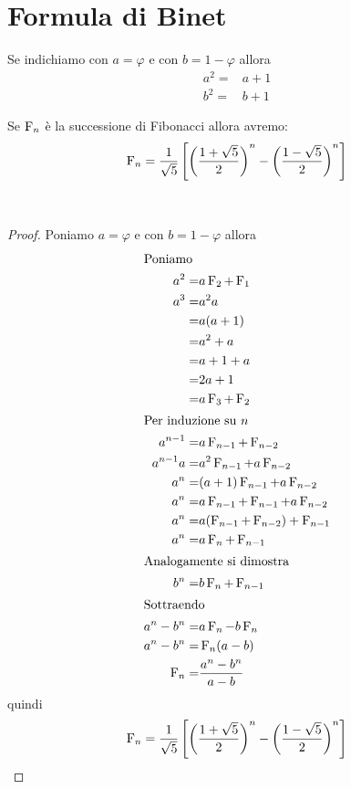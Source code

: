 \section{Formula di Binet}
\begin{lem}\label{lem:SezioneAurea}
	Se indichiamo con $a=\varphi$ e con $b=1-\varphi$
	allora
	\begin{align*}
		a^2=&a+1\\
		b^2=&b+1
	\end{align*}
\end{lem}
\begin{thm}
	Se $\operatorname{F}_{n}$ è la successione di Fibonacci allora avremo:
	\begin{equation}
		\operatorname{F}_{n}=\dfrac{1}{\sqrt{5}}\left[\left(\dfrac{1+\sqrt{5}}{2}\right)^n-\left(\dfrac{1-\sqrt{5}}{2}\right)^n\right]
	\end{equation}\label{eqn:FinBinet}
\end{thm}~\cite{Conti2020}
\begin{proof}
	Poniamo $a=\varphi$ e con $b=1-\varphi$ allora
	\begin{align*}
		\intertext{Poniamo}
		a^2=&a\operatorname{F}_{2}+\operatorname{F}_{1}\\
		a^3=&a^2a\\
		=&a(a+1)\\
		=&a^2+a\\
		=&a+1+a\\
		=&2a+1\\
		=&a\operatorname{F}_{3}+\operatorname{F}_{2}\\
		\intertext{Per induzione su $n$}
		a^{n-1}=&a\operatorname{F}_{n-1}+\operatorname{F}_{n-2}\\
		a^{n-1}a=&a^2\operatorname{F}_{n-1}+a\operatorname{F}_{n-2}\\
		a^{n}=&(a+1)\operatorname{F}_{n-1}+a\operatorname{F}_{n-2}\\
		a^{n}=&a\operatorname{F}_{n-1}+\operatorname{F}_{n-1}+a\operatorname{F}_{n-2}\\
		a^{n}=&a(\operatorname{F}_{n-1}+\operatorname{F}_{n-2})+\operatorname{F}_{n-1}\\
		a^{n}=&a\operatorname{F}_{n}+\operatorname{F}_{n-1}\\
		\intertext{Analogamente si dimostra}
		b^{n}=&b\operatorname{F}_{n}+\operatorname{F}_{n-1}\\
		\intertext{Sottraendo}
		a^n-b^n=&a\operatorname{F}_{n}-b\operatorname{F}_{n}\\
		a^n-b^n=&\operatorname{F}_{n}(a-b)\\
		\operatorname{F}_{n}=&\dfrac{a^n-b^n}{a-b}
	\end{align*}
quindi
\begin{equation}
\operatorname{F}_{n}=\dfrac{1}{\sqrt{5}}\left[\left(\dfrac{1+\sqrt{5}}{2}\right)^n-\left(\dfrac{1-\sqrt{5}}{2}\right)^n\right]
\end{equation}
\end{proof}
